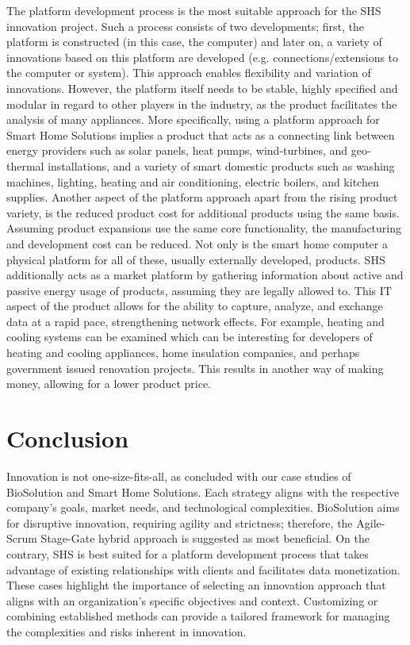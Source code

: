 \documentclass[a4paper,10pt,UTF8]{scrartcl}
\begin{document}
The platform development process is the most suitable approach for the SHS innovation project. Such a process consists of two developments; first, the platform is constructed (in this case, the computer) and later on, a variety of innovations based on this platform are developed (e.g. connections/extensions to the computer or system). This approach enables flexibility and variation of innovations. However, the platform itself needs to be stable, highly specified and modular in regard to other players in the industry, as the product facilitates the analysis of many appliances. More specifically, using a platform approach for Smart Home Solutions implies a product that acts as a connecting link between energy providers such as solar panels, heat pumps, wind-turbines, and geo-thermal installations, and a variety of smart domestic products such as washing machines, lighting, heating and air conditioning, electric boilers, and kitchen supplies. Another aspect of the platform approach apart from the rising product variety, is the reduced product cost for additional products using the same basis. Assuming product expansions use the same core functionality, the manufacturing and development cost can be reduced. Not only is the smart home computer a physical platform for all of these, usually externally developed, products. SHS additionally acts as a market platform by gathering information about active and passive energy usage of products, assuming they are legally allowed to. This IT aspect of the product allows for the ability to capture, analyze, and exchange data at a rapid pace, strengthening network effects. For example, heating and cooling systems can be examined which can be interesting for developers of heating and cooling appliances, home insulation companies, and perhaps government issued renovation projects. This results in another way of making money, allowing for a lower product price. 



\section{Conclusion}

Innovation is not one-size-fits-all, as concluded with our case studies of BioSolution and Smart Home Solutions. Each strategy aligns with the respective company's goals, market needs, and technological complexities. BioSolution aims for disruptive innovation, requiring agility and strictness; therefore, the Agile-Scrum Stage-Gate hybrid approach is suggested as most beneficial. On the contrary, SHS is best suited for a platform development process that takes advantage of existing relationships with clients and facilitates data monetization. These cases highlight the importance of selecting an innovation approach that aligns with an organization’s specific objectives and context. Customizing or combining established methods can provide a tailored framework for managing the complexities and risks inherent in innovation.
\end{document}
